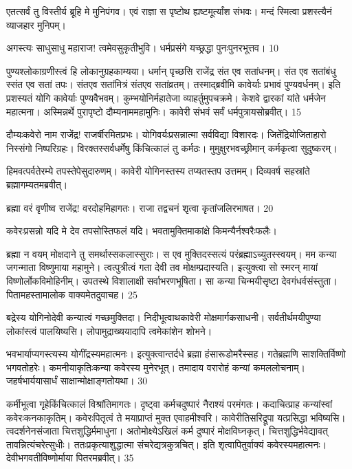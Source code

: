 एतत्सर्वं तु विस्तीर्य ब्रूहि मे मुनिपंगव।
एवं राज्ञा स पृष्टोथ ह्यष्टमूर्त्यांश संभवः।
मन्दं स्मित्वा प्रशस्त्यैनं व्याजहार मुनिपम्।

अगस्त्यः
साधुसाधु महाराज! त्वमेवसुकृतीभुवि।
धर्मप्रसंगे यच्छ्रद्धा पुनःपुनरभूत्तव।
10

पुण्यश्लोकाग्रणीस्त्वं हि लोकानुग्रहकाम्यया।
धर्मान् पृच्छसि राजेंद्र संत एव सतांधनम्।
संत एव सतांबंधु स्संत एव सतां तपः।
संतएव सतांमित्रं संतएव सतांव्रतम्।
तस्माद्ब्रवीमि कावेर्याः प्रभावं पुण्यवर्धनम्।
इति प्रशस्यतं योगि कावेर्याः पुण्यवैभवम्।
कुम्भयोनिर्महातेजा व्याहर्तुमुपचक्रमे।
केशवे द्वारकां यांते धर्मजेन महात्मना।
अस्मिन्नर्थे पुरापृष्टो दौम्यनाममहामुनिः।
कावेरी संभवं सर्वं धर्मपुत्रायसोब्रवीत्।
15

दौम्यःकवेरो नाम राजेंद्र! राजर्षीरमितप्रभः।
योगिवर्यःप्रसन्नात्मा सर्वविद्या विशारदः।
जितेंद्रियोजिताहारो निस्संगो निष्परिग्रहः।
विरक्तस्सर्वधर्मेषु किंचित्कालं तु कर्मठः।
मुमुक्षुरभवच्छ्रीमान् कर्मकृत्वा सुदुष्करम्।

हिमवत्पर्वतेरम्ये तपस्तेपेसुदारुणम्।
कावेरी योगिनस्तस्य तप्यतस्तप उत्तमम्।
दिव्यवर्ष सहस्रांते ब्रह्मागम्यतमब्रवीत्।

ब्रह्मा
वरं वृणीष्व राजेंद्र! वरदोहमिहागतः।
राजा तद्वचनं शृत्वा कृतांजलिरभाषत।
20

कवेरःप्रसन्नो यदि मे देव तपसोस्तिफलं यदि।
भवतामुक्तिमाकांक्षे किमन्यैर्नश्वरैःफलैः।

ब्रह्मा
न वयम् मोक्षदाने तु समर्थास्सकलास्सुराः।
स एव मुक्तिदस्सत्यं परंब्रह्माऽच्युतस्स्वयम्।
मम कन्या जगन्माता विष्णुमाया महामुने।
त्वत्पुत्रीत्वं गता देवी तव मोक्षम्प्रदास्यति।
इत्युक्त्वा सो स्मरन् मायां विष्णोर्लोकविमोहिनीम्।
उपतस्थे विशालाक्षी सर्वाभरणभूषिता।
सा कन्या चिन्मयीसृष्टा देवगंधर्वसंस्तुता।
पितामहस्तामालोक वाक्यमेतदुवाचह।
25

बद्रेस्य योगिनोदेवी कन्यात्वं गच्छमुक्तिदा।
निदीभूत्वाथकावेरी मोक्षमार्गकसाधनी।
सर्वतीर्थमयीपुण्या लोकांस्त्वं पालयिष्यसि।
लोपामुद्राख्ययादापि त्वमेकांशेन शोभने।

भवभार्याप्यगस्त्यस्य योगींद्रस्यमहात्मनः।
इत्युक्त्वान्तर्दधे ब्रह्मा हंसारूडोमरैस्सह।
गतेब्रह्मणि साशक्तिर्विष्णो भगवतोहरेः।
कमनीयाकृतिःकन्या कवेरस्य मुनेरभूत्।
तमादाय वरारोहं कन्यां कमललोचनाम्।
जहर्षभार्ययासार्धं साक्षान्मोक्षाङ्गतोयथा।
30

कर्मीभूत्वा गृहेकिंचित्कालं विश्रांतिमागतः।
दृष्ट्वा कर्मचदुष्पारं नैराश्यं परमंगतः।
कदाचित्प्राह कन्यांस्वां कवेरःकनकाकृतिम्।
कवेरःपितृत्वं ते मयाप्राप्तं मुक्त एवाहमीश्वरि।
कावेरीतिसरिद्रूपा यत्प्रसिद्धा भविष्यसि।
त्वदर्शनेनसंजाता चित्तशुद्धिर्ममाधुना।
अतोमोक्ष्येऽखिलं कर्म दुष्पारं मोक्षविघ्नकृत्।
चित्तशुद्धिर्भवेद्यावत् तावन्नित्यंचरेत्सुधीः।
ततःप्रकृत्याशुद्धात्मा संचरेद्यत्रकुत्रचित्।
इति शृत्वापितुर्वाक्यं कवेरस्यमहात्मनः।
देवीभगवतीविष्णोर्माया पितरमब्रवीत्।
35

